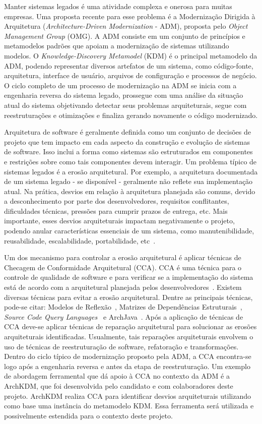 \documentclass[12pt]{article}
\begin{document}
Manter sistemas legados é uma atividade complexa e onerosa para muitas empresas. Uma proposta recente para esse problema é a Modernização Dirigida à Arquitetura (\textit{Architecture-Driven Modernization} - ADM), proposta pelo \textit{Object Management Group} (OMG). A ADM consiste em um conjunto de princípios e metamodelos padrões que apoiam a modernização de sistemas utilizando modelos. O \textit{Knowledge-Discovery Metamodel} (KDM) é o principal metamodelo da ADM, podendo representar diversos artefatos de um sistema, como código-fonte, arquitetura, interface de usuário, arquivos de configuração e processos de negócio. O ciclo completo de um processo de modernização na ADM se inicia com a engenharia reversa do sistema legado, prossegue com uma análise da situação atual do sistema objetivando detectar seus problemas arquiteturais, segue com reestruturações e otimizações e finaliza gerando novamente o código modernizado.


Arquitetura de software é geralmente definida como um conjunto de decisões de projeto que tem impacto em cada aspecto da construção e evolução de sistemas de software. Isso inclui a forma como sistemas são estruturados em componentes e restrições sobre como tais componentes devem interagir. Um problema típico de sistemas legados é a erosão arquitetural. Por exemplo, a arquitetura documentada de um sistema legado - se disponível - geralmente não reflete sua implementação atual. Na prática, desvios em relação à arquitetura planejada são comuns, devido a desconhecimento por parte dos desenvolvedores, requisitos conflitantes, dificuldades técnicas, pressões para cumprir prazos de entrega, etc. Mais importante, esses desvios arquiteturais impactam negativamente o projeto, podendo anular características essenciais de um sistema, como manutenibilidade, reusabilidade, escalabilidade, portabilidade, etc~\cite{Passos_2010}.

Um dos mecanismo para controlar a erosão arquitetural é aplicar técnicas de Checagem de Conformidade Arquitetural (CCA). CCA é uma técnica para o controle de qualidade de software e para verificar se a implementação do sistema está de acordo com a arquitetural planejada pelos desenvolvedores~\cite{Knodel_2007}. Existem diversas técnicas para evitar a erosão arquitetural. Dentre as principais técnicas, pode-se citar: Modelos de Reflexão~\cite{Murphy_1995}, Matrizes de Dependências Estruturais~\cite{Sangal_2005}, \textit{Source Code Query Languages}~\cite{Verbaere_2008} e ArchJava~\cite{ArchJava_2202}. Após a aplicação de técnicas de CCA deve-se aplicar técnicas de reparação arquitetural para solucionar as erosões arquiteturais identificadas. Usualmente, tais reparações arquiteturais envolvem o uso de técnicas de reestruturação de software, refatoração e transformações. Dentro do ciclo típico de modernização proposto pela ADM, a CCA encontra-se logo após a engenharia reversa e antes da etapa de reestruturação. Um exemplo de abordagem ferramental que dá apoio à CCA no contexto da ADM é a ArchKDM, que foi desenvolvida pelo candidato e com colaboradores deste projeto. ArchKDM realiza CCA para identificar desvios arquiteturais utilizando como base uma instância do metamodelo KDM. Essa ferramenta será utilizada e possivelmente estendida para o contexto deste projeto.
\end{document}

